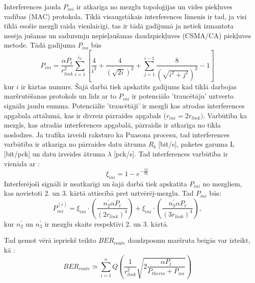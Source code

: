 Interferences jauda $P_{ini}$ ir atkarīga no mezglu topoloģijas un vides piekļuves vadības (\acs{MAC}) protokola. Tīklā visaugstākais interferences līmenis ir tad, ja visi tīklā esošie mezgli raida vienlaicīgi, tas ir tādā gadījumā ja netiek izmantota nesēja jušanas un sadursmju nepieļaušanas daudzpiekļuves (\acs{CSMA/CA}) piekļuves metode. Tādā gadījuma $P_{ini}$ būs \cite{route_res}
\begin{equation}
P_{ini}=\frac{\alpha P_{t}}{r_{link}^{2}}\sum^{i_{n}}_{i=1}\left[\frac{4}{i^{2}}+\frac{4}{(\sqrt{2i})^{2}}+\sum^{i-1}_{j=1}\frac{8}{(\sqrt{i^{2}+j^{2}})^{2}}-1\right]
\end{equation}
kur $i$ ir kārtas numurs.
Šajā darbā tiek apskatīts gadījums kad tīklā darbojas maršrutēšanas protokols un līdz ar to $P_{ini}$ ir potenciālo 'traucētāju' uztverto signālu jaudu summa. Potenciālie 'traucētāji' ir mezgli kas atrodas interferences apgabala attālumā, kas ir divreiz pārraides apgabals ($r_{ini}=2r_{link})$. Varbūtība ka mezgls, kas atradās interferences apgabalā, pārraidīs ir atkarīga no tīkla noslodzes. Ja trafika izveidi raksturo ka Puasona  procesu, tad interferences varbūtība ir atkarīga no pārraides datu ātruma $R_{b}$ [bit/s], paketes garuma L [bit/pck] un datu izveides ātruma $\lambda$ [pck/s]. Tad interferences varbūtība ir vienāda ar \cite{ferrari17}:
\begin{equation}
 \xi_{ini}= 1-e^{-\frac{\lambda L}{R_{b}}}
\end{equation}
Interferējoši signāli ir neatkarīgi un šajā darbā tiek apskatīta $P_{ini}$ no mezgliem, kas novietoti 2. un 3. kārtā attiecībā pret uztvērēj-mezglu. Tad $P_{ini}$ būs:
\begin{equation}
 P_{ini}^{(i)}=\xi_{ini}\cdot\left(\frac{n_{2}^{'} \alpha P_{t}}{(2r_{link})^{4}}\right) + \xi_{ini}\cdot\left( \frac{n_{3}^{'} \alpha P_{t}}{(3r_{link})^{4}}\right),
\label{eq:ini}
\end{equation}
kur $n_{2}^{'}$ un $n_{3}^{'}$ ir mezglu skaits respektīvi 2. un 3. kārtā.

Tad ņemot vērā iepriekš teikto $BER_{route}$ daudzposmu maršruta beigās var izteikt, kā \cite{ferrari17}:
\begin{equation}
 BER_{route}\simeq \sum_{i=1}^{n}Q\left( \frac{1}{r_{link}^{2}}\sqrt{2\frac{\alpha P_{t}}{P_{therm}+P_{ini}}}\right)
\end{equation}



